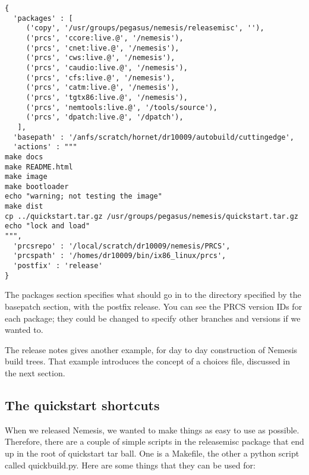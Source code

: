 \documentclass[a4paper]{article}
\begin{document}
\begin{verbatim}
{
  'packages' : [
     ('copy', '/usr/groups/pegasus/nemesis/releasemisc', ''),
     ('prcs', 'ccore:live.@', '/nemesis'),
     ('prcs', 'cnet:live.@', '/nemesis'),
     ('prcs', 'cws:live.@', '/nemesis'),
     ('prcs', 'caudio:live.@', '/nemesis'),
     ('prcs', 'cfs:live.@', '/nemesis'),
     ('prcs', 'catm:live.@', '/nemesis'),
     ('prcs', 'tgtx86:live.@', '/nemesis'),
     ('prcs', 'nemtools:live.@', '/tools/source'),
     ('prcs', 'dpatch:live.@', '/dpatch'), 
   ],
  'basepath' : '/anfs/scratch/hornet/dr10009/autobuild/cuttingedge',
  'actions' : """
make docs
make README.html
make image
make bootloader
echo "warning; not testing the image"
make dist
cp ../quickstart.tar.gz /usr/groups/pegasus/nemesis/quickstart.tar.gz
echo "lock and load"
""",
  'prcsrepo' : '/local/scratch/dr10009/nemesis/PRCS',
  'prcspath' : '/homes/dr10009/bin/ix86_linux/prcs',
  'postfix' : 'release'
}
\end{verbatim}

The packages section specifies what should go in to the directory
specified by the basepatch section, with the postfix release. You can
see the PRCS version IDs for each package; they could be changed to
specify other branches and versions if we wanted to.

The release notes gives another example, for day to day construction
of Nemesis build trees. That example introduces the concept of a
choices file, discussed in the next section.

\subsection{The quickstart shortcuts}

When we released Nemesis, we wanted to make things as easy to use as
possible. Therefore, there are a couple of simple scripts in the
releasemisc package that end up in the root of quickstart tar
ball. One is a Makefile, the other a python script called
quickbuild.py. Here are some things that they can be used for:
\end{document}
